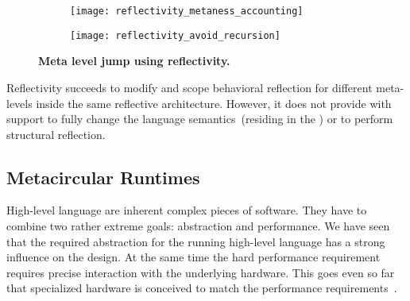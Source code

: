 \begin{figure}[ht]
\begin{center}
\begin{subfigure}{.45\textwidth}
\texttt{[image: reflectivity\_metaness\_accounting]}
\end{subfigure}
\begin{subfigure}{.45\textwidth}
\texttt{[image: reflectivity\_avoid\_recursion]}
\end{subfigure}
\caption{\textbf{Meta level jump using reflectivity.}\label{fig:reflectivity_avoid_meta_recursion}
 }
\end{center}
\end{figure}

Reflectivity succeeds to modify and scope behavioral reflection for different meta-levels inside the same reflective architecture. However, it does not provide with support to fully change the language semantics~(residing in the \VM) or to perform structural reflection.

\subsection{Metacircular Runtimes}

High-level language \VMs are inherent complex pieces of software.
They have to combine two rather extreme goals: abstraction and performance.
We have seen that the required abstraction for the running high-level language has a strong influence on the \VM design.
At the same time the hard performance requirement requires precise interaction with the underlying hardware.
This goes even so far that specialized hardware is conceived to match the performance requirements~\cite{Unga84a,Stef84a,McGh98a,Clic05a}.

